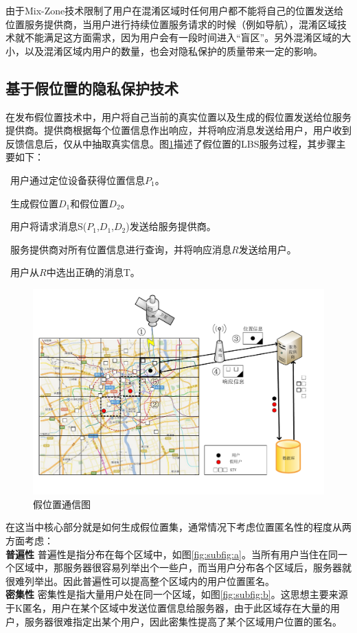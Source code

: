 由于Mix-Zone技术限制了用户在混淆区域时任何用户都不能将自己的位置发送给位置服务提供商，当用户进行持续位置服务请求的时候（例如导航），混淆区域技术就不能满足这方面需求，因为用户会有一段时间进入“盲区”。另外混淆区域的大小，以及混淆区域内用户的数量，也会对隐私保护的质量带来一定的影响。

\subsection{基于假位置的隐私保护技术}
在发布假位置技术中，用户将自己当前的真实位置以及生成的假位置发送给位服务提供商。提供商根据每个位置信息作出响应，并将响应消息发送给用户，用户收到反馈信息后，仅从中抽取真实信息。图\ref{fig:Dummy_pdf}描述了假位置的LBS服务过程，其步骤主要如下：	

~用户通过定位设备获得位置信息$P_1$。

~生成假位置$D_1$和假位置$D_2$。

~用户将请求消息S($P_1$,$D_1$,$D_2$)发送给服务提供商。

~服务提供商对所有位置信息进行查询，并将响应消息$R$发送给用户。

~用户从$R$中选出正确的消息T。
\begin{figure}[H]
\centering
\includegraphics[width=12cm]{fig/Dummy.pdf}
\caption{假位置通信图} %
\label{fig:Dummy_pdf}
\end{figure}
在这当中核心部分就是如何生成假位置集，通常情况下考虑位置匿名性的程度从两方面考虑：\\
\textbf {普遍性} 普遍性是指分布在每个区域中，如图\ref{fig:subfig:a}。当所有用户当住在同一个区域中，那服务器很容易列举出个一些户，而当用户分布各个区域后，服务器就很难列举出。因此普遍性可以提高整个区域内的用户位置匿名。\\
\textbf {密集性} 密集性是指大量用户处在同一个区域，如图\ref{fig:subfig:b}。这思想主要来源于K匿名，用户在某个区域中发送位置信息给服务器，由于此区域存在大量的用户，服务器很难指定出某个用户，因此密集性提高了某个区域用户位置的匿名。


